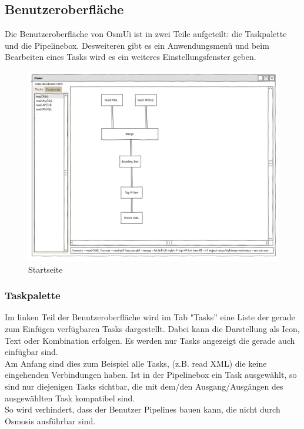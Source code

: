 \documentclass[a4paper,12pt]{scrartcl}
\begin{document}
\subsection{Benutzeroberfläche}
Die Benutzeroberfläche von OsmUi ist in zwei Teile aufgeteilt: die Taskpalette und die Pipelinebox. Desweiteren gibt es ein Anwendungsmenü und beim Bearbeiten eines Tasks
wird es ein weiteres Einstellungsfenster geben.\\
\begin{center}
\begin{figure}[h!]
\begin{center}
\includegraphics[width=15cm]{ui_prototype/OsmUi_Startseite.png}
\caption{Startseite}
\end{center}
\end{figure}
\end{center}
\subsubsection{Taskpalette}
Im linken Teil der Benutzeroberfläche wird im Tab "Tasks'' eine Liste der gerade zum Einfügen verfügbaren Tasks dargestellt. Dabei kann die Darstellung als Icon,
Text oder Kombination erfolgen. Es werden nur Tasks angezeigt die gerade auch einfügbar sind. \\
Am Anfang sind dies zum Beispiel alle Tasks, (z.B. read XML) die keine eingehenden Verbindungen haben. Ist in der Pipelinebox ein Task ausgewählt, so
sind nur diejenigen Tasks sichtbar, die mit dem/den Ausgang/Ausgängen des ausgewählten Task kompatibel sind.\\
So wird verhindert, dass der Benutzer Pipelines bauen kann, die nicht durch Osmosis ausführbar sind.
\end{document}

